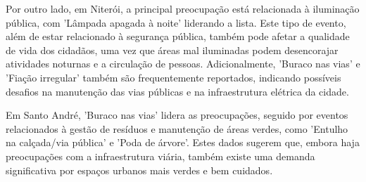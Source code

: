 Por outro lado, em Niterói, a principal preocupação está relacionada à iluminação pública, com 'Lâmpada apagada à noite' liderando a lista. Este tipo de evento, além de estar relacionado à segurança pública, também pode afetar a qualidade de vida dos cidadãos, uma vez que áreas mal iluminadas podem desencorajar atividades noturnas e a circulação de pessoas. Adicionalmente, 'Buraco nas vias' e 'Fiação irregular' também são frequentemente reportados, indicando possíveis desafios na manutenção das vias públicas e na infraestrutura elétrica da cidade.

Em Santo André, 'Buraco nas vias' lidera as preocupações, seguido por eventos relacionados à gestão de resíduos e manutenção de áreas verdes, como 'Entulho na calçada/via pública' e 'Poda de árvore'. Estes dados sugerem que, embora haja preocupações com a infraestrutura viária, também existe uma demanda significativa por espaços urbanos mais verdes e bem cuidados.


